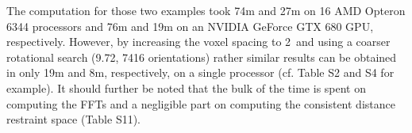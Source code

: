 {}

The computation for those two examples took 74m and 27m on 16 AMD Opteron 6344
processors and 76m and 19m on an NVIDIA GeForce GTX 680 GPU, respectively.
However, by increasing the voxel spacing to 2\Angstrom\ and using a coarser
rotational search (9.72\Deg, 7416 orientations) rather similar results can be
obtained in only 19m and 8m, respectively, on a single processor (cf. Table S2
and S4 for example). It should further be noted that the bulk of the time is
spent on computing the FFTs and a negligible part on computing the consistent
distance restraint space (Table S11).

